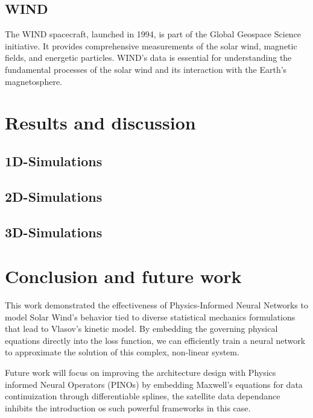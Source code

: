 \documentclass[12pt]{article}
\begin{document}
\subsection{WIND}
The WIND spacecraft, launched in 1994, is part of the Global Geospace Science initiative. It provides comprehensive measurements of the solar wind, magnetic fields, and energetic particles. WIND's data is essential for understanding the fundamental processes of the solar wind and its interaction with the Earth's magnetosphere.

\section{Results and discussion}

\subsection{1D-Simulations}

\subsection{2D-Simulations}

\subsection{3D-Simulations}

\section{Conclusion and future work}
This work demonstrated the effectiveness of Physics-Informed Neural Networks to model Solar Wind's behavior tied to diverse statistical mechanics formulations that lead to Vlasov's kinetic model. By embedding the governing physical equations directly into the loss function, we can efficiently train a neural network to approximate the solution of this complex, non-linear system.

Future work will focus on improving the architecture design with Physics informed Neural Operators (PINOs) \cite{li2023physicsinformedneuraloperatorlearning} by embedding Maxwell's equations for data continuization through differentiable splines, the satellite data dependance inhibits the introduction os such powerful frameworks in this case.




\end{document}
